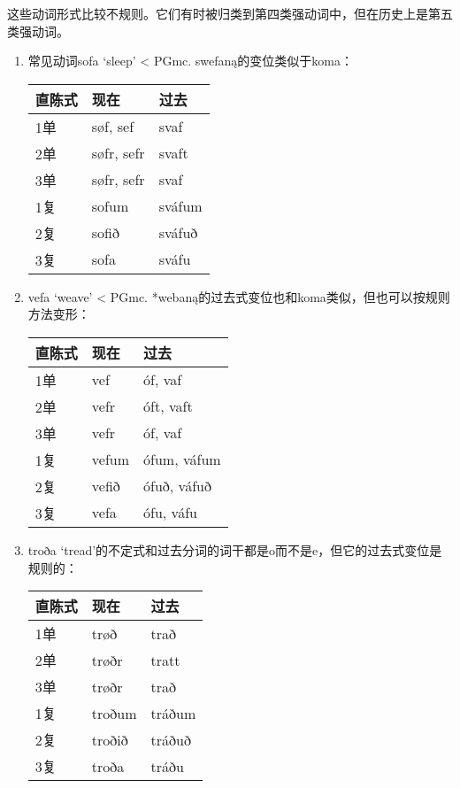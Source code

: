这些动词形式比较不规则。它们有时被归类到第四类强动词中，但在历史上是第五类强动词。

\begin{enumerate}
    \item
          常见动词sofa `sleep‌' < PGmc. swefaną的变位类似于koma：

          \begin{longtable}{lll}
              \toprule
              直陈式 & 现在         & 过去     \\
              \midrule
              \endhead
              \bottomrule
              \endfoot
              1单  & søf, sef   & svaf   \\
              2单  & søfr, sefr & svaft  \\
              3单  & søfr, sefr & svaf   \\
              1复  & sofum      & sváfum \\
              2复  & sofið      & sváfuð \\
              3复  & sofa       & sváfu  \\
          \end{longtable}

    \item
          vefa `weave' < PGmc. *webaną的过去式变位也和koma类似，但也可以按规则方法变形：

          \begin{longtable}{lll}
              \toprule
              直陈式 & 现在    & 过去          \\
              \midrule
              \endhead
              \bottomrule
              \endfoot
              1单  & vef   & óf, vaf     \\
              2单  & vefr  & óft, vaft   \\
              3单  & vefr  & óf, vaf     \\
              1复  & vefum & ófum, váfum \\
              2复  & vefið & ófuð, váfuð \\
              3复  & vefa  & ófu, váfu   \\
          \end{longtable}
    \item
          troða
          `tread‌'的不定式和过去分词的词干都是o而不是e，但它的过去式变位是规则的：

          \begin{longtable}{lll}
              \toprule
              直陈式 & 现在     & 过去     \\
              \midrule
              \endhead
              \bottomrule
              \endfoot
              1单  & trøð   & trað   \\
              2单  & trøðr  & tratt  \\
              3单  & trøðr  & trað   \\
              1复  & troðum & tráðum \\
              2复  & troðið & tráðuð \\
              3复  & troða  & tráðu  \\
          \end{longtable}


\end{enumerate}
